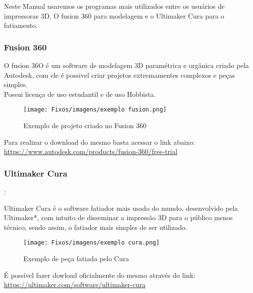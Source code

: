 Neste Manual usaremos os programas mais utilizados entre os usuários de impressoras 3D. O fusion 360 para modelagem e o Ultimaker Cura para o fatiamento.\\[0.3cm]

\subsubsection{Fusion 360}

O fusion 36O é um software de modelagem 3D paramétrica e orgânica criado pela Autodesk, com ele
é possivel criar projetos extremamentes complexos e peças simples.\\[0.3cm]
Possui licença de uso estudantil e de uso Hobbista.\\[0.3cm]

\begin{figure}[h!]
    \centering
    \texttt{[image: Fixos/imagens/exemplo fusion.png]}
    \caption{Exemplo de projeto criado no Fusion 360}
    \label{fig:my_label}
\end{figure}

Para realizar o download do mesmo basta acessar o link abaixo:\\[0.3cm]

\href{https://www.autodesk.com/products/fusion-360/free-trial}{https://www.autodesk.com/products/fusion-360/free-trial}


\subsubsection{Ultimaker Cura}:

Ultimaker Cura é o software fatiador mais usado do mundo, desenvolvido pela Ultimaker*, com intuito de disseminar a impressão 3D para o público menos técnico, sendo assim, o fatiador mais simples de ser utilizado.\\[0.3cm]

\begin{figure}[h!]
    \centering
    \texttt{[image: Fixos/imagens/exemplo cura.png]}
    \caption{Exemplo de peça fatiada pelo Cura}
    \label{fig:my_label}
\end{figure}

É possível fazer dowload oficialmente do mesmo através do link:\\[0.3cm]
%
\href{https://ultimaker.com/software/ultimaker-cura}{https://ultimaker.com/software/ultimaker-cura}\\[0.3cm]

